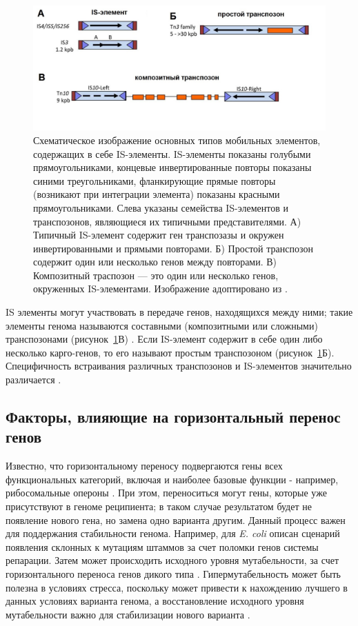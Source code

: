 \begin{figure}[!ht] 
  \center
  \includegraphics [width=\textwidth] {Dissertation/images/lit/trans.jpg}
  \caption{Схематическое изображение основных типов мобильных элементов, содержащих в себе IS-элементы. IS-элементы показаны голубыми прямоугольниками, концевые инвертированные повторы показаны синими треугольниками, фланкирующие прямые повторы (возникают при интеграции элемента) показаны красными прямоугольниками. Слева указаны семейства IS-элементов и транспозонов, являющиеся их типичными представителями. А) Типичный IS-элемент содержит ген транспозазы и окружен инвертированными и прямыми повторами. Б) Простой транспозон содержит один или несколько генов между повторами. В) Композитный траспозон --- это один или несколько генов, окруженных IS-элементами. Изображение адоптировано из \cite{siguier2015everyman}.} 
  \label{img:transposone}  
\end{figure}

IS элементы могут участвовать в передаче генов, находящихся между ними; такие элементы генома называются составными (композитными или сложными) транспозонами (рисунок~\ref{img:transposone}В) \cite{alton1979nucleotide}. Если IS-элемент содержит в себе один либо несколько карго-генов, то его называют простым транспозоном (рисунок~\ref{img:transposone}Б).  Специфичность встраивания различных транспозонов и IS-элементов значительно различается \cite{wilde2003transposases}.

\subsection{Факторы, влияющие на горизонтальный перенос генов}
Известно, что горизонтальному переносу подвергаются гены всех функциональных категорий, включая и наиболее базовые функции - например, рибосомальные опероны \cite{gogarten2002prokaryotic}. При этом, переноситься могут гены, которые уже присутствуют в геноме реципиента; в таком случае результатом будет не появление нового гена, но замена одно варианта другим. Данный процесс важен для поддержания стабильности генома. Например, для \textit{E. coli} описан сценарий появления склонных к мутациям штаммов за счет поломки генов системы репарации. Затем может происходить исходного уровня мутабельности, за счет горизонтального переноса генов дикого типа \cite{brown2001phylogenetic}. Гипермутабельность может быть полезна в условиях стресса, поскольку может привести к нахождению лучшего в данных условиях варианта генома, а восстановление исходного уровня мутабельности важно для стабилизации нового варианта \cite{caporale2006implicit}.

